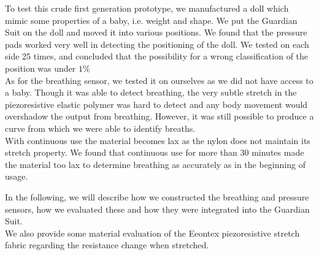 \documentclass{sigchi-ext}
\begin{document}
To test this crude first generation prototype, we manufactured a doll which 
mimic some properties of a baby, i.e. weight and shape. We put the Guardian Suit
on the doll and moved it into various positions. We found that the pressure pads
worked very well in detecting the positioning of the doll. We tested on each side 25 times, and concluded that the possibility for a wrong classification of the position was under $1\%$\\
As for the breathing
sensor, we tested it on ourselves as we did not have access to a baby. Though
it was able to detect breathing, the very subtle stretch in the piezoresistive
elastic polymer was hard to detect and any body movement would overshadow the output
from breathing. However, it was still possible to produce a curve from which 
we were able to identify breaths.\\
With continuous use the material becomes lax as the nylon does not maintain its stretch
property. We found that continuous use for more than 30 minutes made the material
too lax to determine breathing as accurately as in the beginning of usage.

In the following, we will describe how we constructed
the breathing and pressure sensors, how we evaluated
these and how they were integrated into the Guardian Suit.\\
We also provide some material evaluation of the Eeontex
piezoresistive stretch fabric regarding the resistance
change when stretched.

\end{document}
